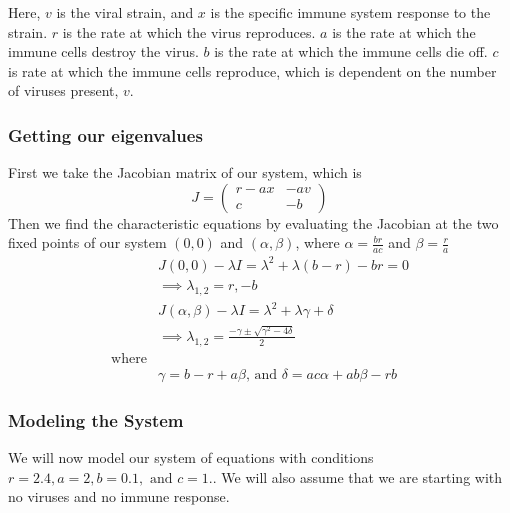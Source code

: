 \documentclass{article}
\begin{document}
Here, $v$ is the viral strain, and $x$ is the specific immune system response to the strain. $r$ is the rate at which the virus reproduces. $a$ is the rate at which the immune cells destroy the virus. $b$ is the rate at which the immune cells die off. $c$ is rate at which the immune cells reproduce, which is dependent on the number of viruses present, $v$.  
\subsubsection{Getting our eigenvalues}
First we take the Jacobian matrix of our system, which is
\begin{equation}
    J =
    \begin{pmatrix}
        r-ax    & -av \\
        c       & -b
    \end{pmatrix}
\end{equation}
Then we find the characteristic equations by evaluating the Jacobian at the two fixed points of our system $(0,0)$ and $(\alpha,\beta)$, where $\alpha = \frac{br}{ac} $ and $\beta = \frac{r}{a} $
\begin{equation}
    \begin{split}
        &J(0,0) - \lambda I = \lambda^2 + \lambda(b-r) -br = 0\\
        &\implies \lambda_{1,2} = r,-b\\
        &J(\alpha,\beta)  - \lambda I =  \lambda^2 + \lambda \gamma + \delta\\ 
        &\implies \lambda_{1,2} = \frac{-\gamma \pm \sqrt{\gamma^2 - 4\delta}}{2} \\
        \text{where} \\
        &\gamma =  b - r + a\beta \text{, and } \delta = ac\alpha + ab\beta -rb
    \end{split}
\end{equation}
\subsubsection{Modeling the System}
We will now model our system of equations with conditions $r = 2.4, a = 2, b = 0.1, \text{ and }c = 1.$. We will also assume that we are starting with no viruses and no immune response.
\label{sub:modeling the sytem}
\end{document}
